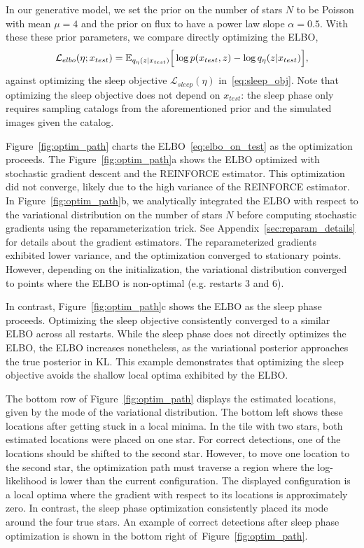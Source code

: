 In our generative model, we set the prior on the number of stars $N$ to be Poisson with mean $\mu = 4$ and the prior on flux to have a power law slope $\alpha = 0.5$. 
With these these prior parameters, we compare directly optimizing the ELBO, 
\begin{align}
\mathcal{L}_{elbo}(\eta; x_{test}) = \mathbb{E}_{q_{\eta}(z | x_{test})}\Big[\log p(x_{test}, z) - \log q_{\eta}(z | x_{test})\Big],
\label{eq:elbo_on_test}
\end{align}
against optimizing the sleep objective $\mathcal{L}_{sleep}(\eta)$ in~\eqref{eq:sleep_obj}. Note that optimizing the sleep objective does not depend on $x_{test}$: the sleep phase only requires sampling catalogs from the aforementioned prior and the simulated images given the catalog. 

Figure~\ref{fig:optim_path} charts the ELBO~\eqref{eq:elbo_on_test} as the optimization proceeds.
The Figure~\ref{fig:optim_path}a shows the ELBO optimized with stochastic gradient descent and the REINFORCE estimator.
This optimization did not converge, likely due to the high variance of the REINFORCE estimator. 
In Figure~\ref{fig:optim_path}b, we analytically integrated the ELBO with respect to the variational distribution on the number of stars $N$ before computing stochastic gradients using the reparameterization trick.
See Appendix~\ref{sec:reparam_details} for details about the gradient estimators. 
The reparameterized gradients exhibited lower variance, and the optimization converged to stationary points. 
However, depending on the initialization, the variational distribution converged to points where the ELBO is non-optimal (e.g. restarts 3 and 6). 

In contrast, Figure~\ref{fig:optim_path}c shows the ELBO as the sleep phase proceeds. 
Optimizing the sleep objective consistently converged to a similar ELBO across all restarts. 
While the sleep phase does not directly optimizes the ELBO, the ELBO increases nonetheless, as the variational posterior approaches the true posterior in $\textrm{KL}$. 
This example demonstrates that optimizing the sleep objective avoids the shallow local optima exhibited by the ELBO. 

The bottom row of Figure~\ref{fig:optim_path} displays the estimated locations, given by the mode of the variational distribution. 
The bottom left shows these locations after getting stuck in a local minima. 
In the tile with two stars, both estimated locations were placed on one star. 
For correct detections, one of the locations should be shifted to the second star. 
However, to move one location to the second star, the optimization path must traverse a region where the log-likelihood is lower than the current configuration. 
The displayed configuration is a local optima where the gradient with respect to its locations is approximately zero.
In contrast, the sleep phase optimization consistently placed its mode around the four true stars. 
An example of correct detections after sleep phase optimization is shown in the bottom right of~Figure~\ref{fig:optim_path}.

